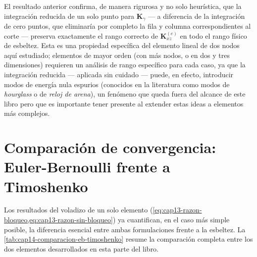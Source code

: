 \begin{observacion}
El resultado anterior confirma, de manera rigurosa y no solo heurística, que la integración reducida de un solo punto para $\bm K_\gamma$ --- a diferencia de la integración de cero puntos, que eliminaría por completo la fila y columna correspondientes al corte --- preserva exactamente el rango correcto de $\bm K^{(e)}_{xz}$ en todo el rango físico de esbeltez. Esta es una propiedad específica del elemento lineal de dos nodos aquí estudiado; elementos de mayor orden (con más nodos, o en dos y tres dimensiones) requieren un análisis de rango específico para cada caso, ya que la integración reducida --- aplicada sin cuidado --- puede, en efecto, introducir modos de energía nula espurios (conocidos en la literatura como modos de \emph{hourglass} o de \emph{reloj de arena}), un fenómeno que queda fuera del alcance de este libro pero que es importante tener presente al extender estas ideas a elementos más complejos.
\end{observacion}

\section{Comparación de convergencia: Euler-Bernoulli frente a Timoshenko}
\label{sec:cap14-comparacion}

Los resultados del voladizo de un solo elemento (\cref{eq:cap13-razon-bloqueo,eq:cap13-razon-sin-bloqueo}) ya cuantifican, en el caso más simple posible, la diferencia esencial entre ambas formulaciones frente a la esbeltez. La \cref{tab:cap14-comparacion-eb-timoshenko} resume la comparación completa entre los dos elementos desarrollados en esta parte del libro.

